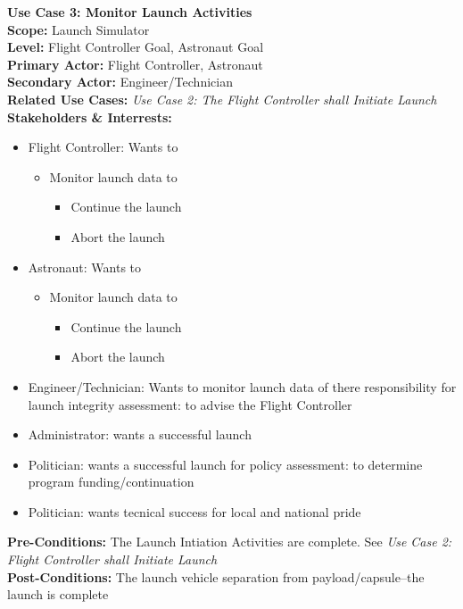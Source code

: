 \documentclass[letterpaper]{article}
\begin{document}
\noindent
\textbf{Use Case 3:  Monitor Launch Activities}\\
\textbf{Scope:  }Launch Simulator\\
\textbf{Level:  }Flight Controller Goal, Astronaut Goal\\
\textbf{Primary Actor:  }Flight Controller, Astronaut\\
\textbf{Secondary Actor:  }Engineer/Technician\\
\textbf{Related Use Cases:  }\textit{Use Case 2:  The Flight Controller
shall Initiate Launch}\\
\textbf{Stakeholders \& Interrests:  }
\begin{itemize}
\item Flight Controller:  Wants to
\begin{itemize}
\item Monitor launch data to
\begin{itemize}
\item Continue the launch
\item Abort the launch
\end{itemize}
\end{itemize}
\item Astronaut:  Wants to 
\begin{itemize}
\item Monitor launch data to
\begin{itemize}
\item Continue the launch
\item Abort the launch
\end{itemize}
\end{itemize}
\item Engineer/Technician:  Wants to monitor launch data
of there responsibility for launch integrity assessment:  to advise
the Flight Controller
\item Administrator:  wants a successful launch
\item Politician:  wants a successful launch for policy assessment:
to determine program funding/continuation
\item Politician:  wants tecnical success for local and national pride
\end{itemize}
\textbf{Pre-Conditions:  }The Launch Intiation Activities are
complete.  See \textit{Use Case 2:  Flight Controller shall
Initiate Launch}\\
\textbf{Post-Conditions:  }The launch vehicle separation from
payload/capsule--the launch is complete\\\\
\end{document}
